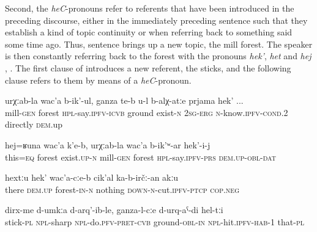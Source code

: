 Second, the \textit{heC}-pronouns refer to referents that have been introduced in the preceding discourse, either in the immediately preceding sentence such that they establish a kind of topic continuity or when referring back to something said some time ago. Thus, sentence  brings up a new topic, the mill forest. The speaker is then constantly referring back to the forest with the pronouns \textit{hek'}, \textit{het} and \textit{hej} , . The first clause of  introduces a new referent, the sticks, and the following clause refers to them by means of a \textit{heC}-pronoun.
%
\begin{exe}
	\ex
	\begin{xlist}
		\ex	\label{There is the forest that is called the mill’s forest, the ground, if you know it directly}
		\gll	urχːab-la	wac'a	b-ik'-ul,	ganza	te-b	u-l	b-alχ-atːe	prjama	hek' ...\\
			mill-\textsc{gen}	forest	\textsc{hpl}-say.\textsc{ipfv}-\textsc{icvb}	ground	exist-\textsc{n}	\textsc{2sg}-\textsc{erg}	\textsc{n}-know.\textsc{ipfv}-\textsc{cond}.2	directly	\textsc{dem}.up\\
		\glt	{}

		\ex	\label{A forest like this exists there, the mill’s forest it is called}
		\gll	hej=ʁuna	wac'a	k'e-b,	urχːab-la	wac'a	b-ik'ʷ-ar	hek'-i-j  \\
			this=\textsc{eq}	forest	exist.\textsc{up}-\textsc{n}	mill-\textsc{gen}	forest	\textsc{hpl}-say.\textsc{ipfv}-\textsc{prs}	\textsc{dem.up}-\textsc{obl}-\textsc{dat}\\
		\glt	{}

		\ex	\label{There in the forest nothing should be cut}
		\gll	hextːu		hek'	wac'a-cːe-b	cik'al	ka-b-irčː-an akːu  \\
			there		\textsc{dem.up}	forest-\textsc{in-n}	nothing	\textsc{down-n}-cut.\textsc{ipfv}-\textsc{ptcp} \textsc{cop.neg}\\
		\glt	{}
	\end{xlist}

		\label{We made sticks and hit them into the ground}
	\sn
	\gll	dirx-me	d-umkːa	d-arq'-ib-le,	ganza-l-cːe	d-urq-aˁ-di	hel-tːi\\
		stick-\textsc{pl}	\textsc{npl}-sharp	\textsc{npl}-do.\textsc{pfv}-\textsc{pret}-\textsc{cvb}	ground-\textsc{obl-in}	\textsc{npl}-hit.\textsc{ipfv}-\textsc{hab}-1	that-\textsc{pl} \\
	\glt	{}
\end{exe}

